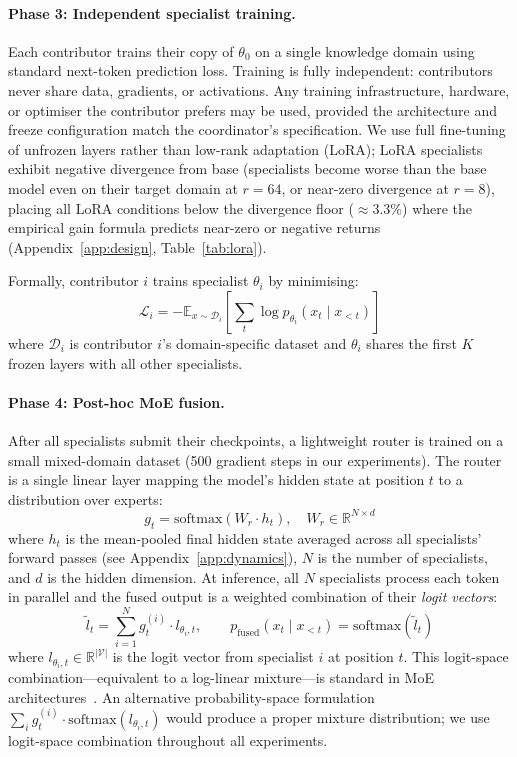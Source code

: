 \documentclass{article}
\begin{document}
\paragraph{Phase 3: Independent specialist training.} Each contributor trains their copy of $\theta_0$ on a single knowledge domain using standard next-token prediction loss. Training is fully independent: contributors never share data, gradients, or activations. Any training infrastructure, hardware, or optimiser the contributor prefers may be used, provided the architecture and freeze configuration match the coordinator's specification. We use full fine-tuning of unfrozen layers rather than low-rank adaptation (LoRA); LoRA specialists exhibit negative divergence from base (specialists become worse than the base model even on their target domain at $r=64$, or near-zero divergence at $r=8$), placing all LoRA conditions below the divergence floor ($\approx$3.3\%) where the empirical gain formula predicts near-zero or negative returns (Appendix~\ref{app:design}, Table~\ref{tab:lora}).

Formally, contributor $i$ trains specialist $\theta_i$ by minimising:
\[
\mathcal{L}_i = -\mathbb{E}_{x \sim \mathcal{D}_i} \left[\sum_t \log p_{\theta_i}(x_t \mid x_{<t})\right]
\]
where $\mathcal{D}_i$ is contributor $i$'s domain-specific dataset and $\theta_i$ shares the first $K$ frozen layers with all other specialists.

\paragraph{Phase 4: Post-hoc MoE fusion.} After all specialists submit their checkpoints, a lightweight router is trained on a small mixed-domain dataset (500 gradient steps in our experiments). The router is a single linear layer mapping the model's hidden state at position $t$ to a distribution over experts:
\[
g_t = \mathrm{softmax}\left(W_r \cdot h_t\right), \quad W_r \in \mathbb{R}^{N \times d}
\]
where $h_t$ is the mean-pooled final hidden state averaged across all specialists' forward passes (see Appendix~\ref{app:dynamics}), $N$ is the number of specialists, and $d$ is the hidden dimension. At inference, all $N$ specialists process each token in parallel and the fused output is a weighted combination of their \emph{logit vectors}:
\[
\tilde{l}_t = \sum_{i=1}^{N} g_t^{(i)} \cdot l_{\theta_i,t}, \qquad
p_\text{fused}(x_t \mid x_{<t}) = \mathrm{softmax}\!\left(\tilde{l}_t\right)
\]
where $l_{\theta_i,t} \in \mathbb{R}^{|\mathcal{V}|}$ is the logit vector from specialist $i$ at position $t$. This logit-space combination---equivalent to a log-linear mixture---is standard in MoE architectures~\citep{shazeer2017outrageously,jiang2024mixtral}. An alternative probability-space formulation $\sum_i g_t^{(i)} \cdot \mathrm{softmax}(l_{\theta_i,t})$ would produce a proper mixture distribution; we use logit-space combination throughout all experiments.
\end{document}
